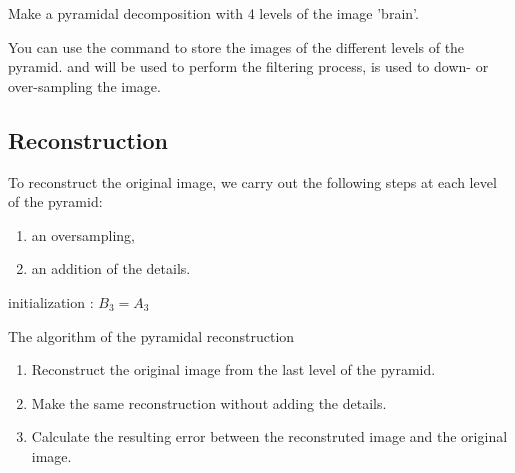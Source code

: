\begin{qbox}Make a pyramidal decomposition with 4 levels of the image 'brain'.
\end{qbox}


\begin{mcomment}
\begin{mremark}
You can use the \matlabregistered{} command  to store the images of the different levels of the pyramid.  and  will be used to perform the filtering process,  is used to down- or over-sampling the image.
\end{mremark}
\end{mcomment}

\vspace*{-4pt}
\subsection{Reconstruction} 
To reconstruct the original image, we carry out the following steps at each level of the pyramid:
\begin{enumerate}
	\item an oversampling,
	\item an addition of the details.
\end{enumerate}

\newpage


\begin{algorithm}[H]
\SetAlgoLined
{}
initialization : $B_3=A_3$\;
\caption{The algorithm of the pyramidal reconstruction}
\end{algorithm}

\begin{qbox}
\begin{enumerate}
	\item Reconstruct the original image from the last level of the pyramid.
	\item Make the same reconstruction without adding the details.
	\item Calculate the resulting error between the reconstruted image and the original image.
\end{enumerate}
\end{qbox}

